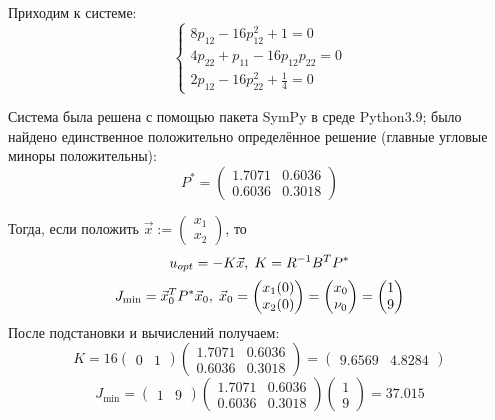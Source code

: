 \documentclass[a4paper,12pt]{article}
\begin{document}
Приходим к системе:
\[ \begin{cases}
    8 p_{12} - 16 p_{12}^2 + 1 = 0 \\
    4 p_{22} + p_{11} - 16 p_{12} p_{22} = 0 \\
    2 p_{12} - 16 p_{22}^2 + \frac{1}{4} = 0
\end{cases} \]

Система была решена с помощью пакета SymPy в среде Python3.9;
было найдено единственное положительно определённое решение (главные угловые миноры положительны):
\[ P^* = \begin{pmatrix}
        1.7071 &  0.6036\\
        0.6036 &  0.3018
    \end{pmatrix} \]

Тогда, если положить  $ \vec x := \begin{pmatrix}
    x_1 \\
    x_2
\end{pmatrix} $, то
\[ u_{opt} = - K \vec x, \thickspace K = R^{-1} B^T P^* \]
\[ J_{\min} = \vec x_0^T P^* \vec x_0, \thickspace \vec x_0 = \begin{pmatrix}
    x_1(0) \\
    x_2(0)
\end{pmatrix} = \begin{pmatrix}
x_0 \\
\nu_0
\end{pmatrix} = \begin{pmatrix}
1 \\
9
\end{pmatrix} \]
После подстановки и вычислений получаем:
\[ K = 16 \begin{pmatrix}
    0 & 1
\end{pmatrix} \begin{pmatrix}
1.7071 &  0.6036\\
0.6036 &  0.3018
\end{pmatrix} = \begin{pmatrix}
9.6569 &  4.8284
\end{pmatrix} \]
\[ J_{\min} = \begin{pmatrix}
    1 & 9
\end{pmatrix} \begin{pmatrix}
1.7071 &  0.6036\\
0.6036 &  0.3018
\end{pmatrix} \begin{pmatrix}
    1 \\
    9
\end{pmatrix} = 37.015 \]
\end{document}
